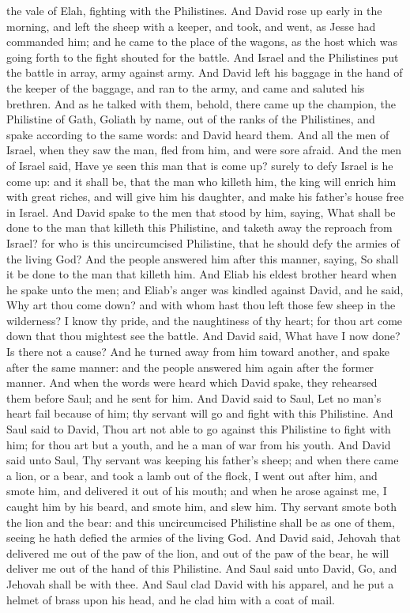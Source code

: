 the vale of Elah, fighting with the Philistines. And David rose up early in the morning, and left the sheep with a keeper, and took, and went, as Jesse had commanded him; and he came to the place of the wagons, as the host which was going forth to the fight shouted for the battle. And Israel and the Philistines put the battle in array, army against army. And David left his baggage in the hand of the keeper of the baggage, and ran to the army, and came and saluted his brethren. And as he talked with them, behold, there came up the champion, the Philistine of Gath, Goliath by name, out of the ranks of the Philistines, and spake according to the same words: and David heard them. And all the men of Israel, when they saw the man, fled from him, and were sore afraid. And the men of Israel said, Have ye seen this man that is come up? surely to defy Israel is he come up: and it shall be, that the man who killeth him, the king will enrich him with great riches, and will give him his daughter, and make his father’s house free in Israel. And David spake to the men that stood by him, saying, What shall be done to the man that killeth this Philistine, and taketh away the reproach from Israel? for who is this uncircumcised Philistine, that he should defy the armies of the living God? And the people answered him after this manner, saying, So shall it be done to the man that killeth him.  And Eliab his eldest brother heard when he spake unto the men; and Eliab’s anger was kindled against David, and he said, Why art thou come down? and with whom hast thou left those few sheep in the wilderness? I know thy pride, and the naughtiness of thy heart; for thou art come down that thou mightest see the battle. And David said, What have I now done? Is there not a cause? And he turned away from him toward another, and spake after the same manner: and the people answered him again after the former manner.  And when the words were heard which David spake, they rehearsed them before Saul; and he sent for him. And David said to Saul, Let no man’s heart fail because of him; thy servant will go and fight with this Philistine. And Saul said to David, Thou art not able to go against this Philistine to fight with him; for thou art but a youth, and he a man of war from his youth. And David said unto Saul, Thy servant was keeping his father’s sheep; and when there came a lion, or a bear, and took a lamb out of the flock, I went out after him, and smote him, and delivered it out of his mouth; and when he arose against me, I caught him by his beard, and smote him, and slew him. Thy servant smote both the lion and the bear: and this uncircumcised Philistine shall be as one of them, seeing he hath defied the armies of the living God. And David said, Jehovah that delivered me out of the paw of the lion, and out of the paw of the bear, he will deliver me out of the hand of this Philistine. And Saul said unto David, Go, and Jehovah shall be with thee. And Saul clad David with his apparel, and he put a helmet of brass upon his head, and he clad him with a coat of mail. 